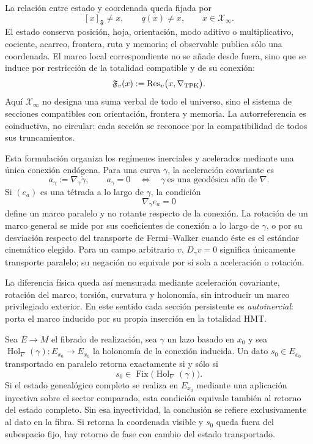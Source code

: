La relación entre estado y coordenada queda fijada por
\[
 [x]_{\mathfrak F}\ne x,
 \qquad
 q(x)\ne x,
 \qquad
 x\in\mathcal X_\infty.
\]
El estado conserva posición, hoja, orientación, modo aditivo o
multiplicativo, cociente, acarreo, frontera, ruta y memoria; el observable
publica sólo una coordenada. El marco local correspondiente no se añade desde
fuera, sino que se induce por restricción de la totalidad compatible y de su
conexión:
\begin{equation}
 \mathfrak F_v(x)
 :=\operatorname{Res}_v\bigl(x,
          \nabla_{\rm TPK}\bigr).
 \label{eq:marco-local-totalidad-rev10}
\end{equation}
Aquí \(\mathcal X_\infty\) no designa una suma verbal de todo el universo,
sino el sistema de secciones compatibles con orientación, frontera y memoria.
La autorreferencia es coinductiva, no circular: cada sección se reconoce por
la compatibilidad de todos sus truncamientos.

Esta formulación organiza los regímenes inerciales y acelerados mediante una
única conexión endógena. Para una curva \(\gamma\), la aceleración covariante
es
\[
 a_\gamma:=\nabla_{\dot\gamma}\dot\gamma,
 \qquad
 a_\gamma=0
 \quad\Longleftrightarrow\quad
 \gamma\ \text{es una geodésica afín de }\nabla.
\]
Si \((e_a)\) es una tétrada a lo largo de \(\gamma\), la condición
\[
 \nabla_{\dot\gamma}e_a=0
\]
define un marco paralelo y no rotante respecto de la conexión. La rotación
de un marco general se mide por sus coeficientes de conexión a lo largo de
\(\gamma\), o por su desviación respecto del transporte de Fermi--Walker
cuando éste es el estándar cinemático elegido. Para un campo arbitrario
\(v\), \(D_\gamma v=0\) significa únicamente transporte paralelo; su
negación no equivale por sí sola a aceleración o rotación.

La diferencia física queda así mensurada mediante aceleración covariante,
rotación del marco, torsión, curvatura y holonomía, sin introducir un marco
privilegiado exterior. En este sentido cada sección persistente es
\emph{autoinercial}: porta el marco inducido por su propia inserción en la
totalidad HMT.

\begin{proposition}
\label{prop:autoinercia-holonomia-rev2}
Sea \(E\to M\) el fibrado de realización, sea \(\gamma\) un lazo basado en
\(x_0\) y sea
\(\operatorname{Hol}_{\nabla}(\gamma):E_{x_0}\to E_{x_0}\) la holonomía de
la conexión inducida. Un dato \(s_0\in E_{x_0}\) transportado en paralelo
retorna exactamente si y sólo si
\[
 s_0\in\operatorname{Fix}
 \bigl(\operatorname{Hol}_{\nabla}(\gamma)\bigr).
\]
Si el estado genealógico completo se realiza en \(E_{x_0}\) mediante una
aplicación inyectiva sobre el sector comparado, esta condición equivale
también al retorno del estado completo. Sin esa inyectividad, la conclusión
se refiere exclusivamente al dato en la fibra. Si retorna la coordenada
visible y \(s_0\) queda fuera del subespacio fijo, hay retorno de fase con
cambio del estado transportado.
\end{proposition}

